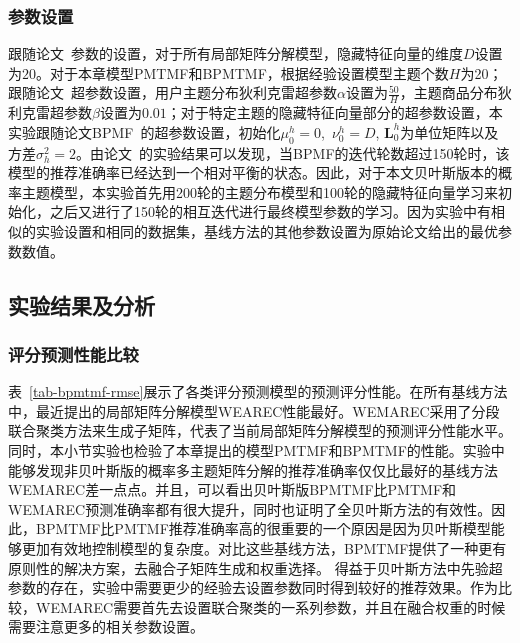 \subsubsection{参数设置} 
跟随论文~\cite{chen2015wemarec,lee2013local}参数的设置，对于所有局部矩阵分解模型，隐藏特征向量的维度$D$设置为$20$。对于本章模型PMTMF和BPMTMF，根据经验设置模型主题个数$H$为20；跟随论文~\cite{griffiths2004finding}超参数设置，用户主题分布狄利克雷超参数$\alpha$设置为$\frac{50}{H}$，主题商品分布狄利克雷超参数$\beta$设置为$0.01$；对于特定主题的隐藏特征向量部分的超参数设置，本实验跟随论文BPMF~\cite{salakhutdinov2008bayesian}的超参数设置，初始化$\mu_0^{h}=0$,\ $\nu_0^{h} = D$, $\mathbf{L}_0^{h}$为单位矩阵以及方差$\sigma_h^2=2$。由论文~\cite{salakhutdinov2008bayesian}的实验结果可以发现，当BPMF的迭代轮数超过150轮时，该模型的推荐准确率已经达到一个相对平衡的状态。因此，对于本文贝叶斯版本的概率主题模型，本实验首先用200轮的主题分布模型和100轮的隐藏特征向量学习来初始化，之后又进行了150轮的相互迭代进行最终模型参数的学习。因为实验中有相似的实验设置和相同的数据集，基线方法的其他参数设置为原始论文给出的最优参数数值。

\subsection{实验结果及分析}

\subsubsection{评分预测性能比较}
\label{subsec-bpmtmf-compare}
表~\ref{tab-bpmtmf-rmse}展示了各类评分预测模型的预测评分性能。在所有基线方法中，最近提出的局部矩阵分解模型WEAREC性能最好。WEMAREC采用了分段联合聚类方法来生成子矩阵，代表了当前局部矩阵分解模型的预测评分性能水平。同时，本小节实验也检验了本章提出的模型PMTMF和BPMTMF的性能。实验中能够发现非贝叶斯版的概率多主题矩阵分解的推荐准确率仅仅比最好的基线方法WEMAREC差一点点。并且，可以看出贝叶斯版BPMTMF比PMTMF和WEMAREC预测准确率都有很大提升，同时也证明了全贝叶斯方法的有效性。因此，BPMTMF比PMTMF推荐准确率高的很重要的一个原因是因为贝叶斯模型能够更加有效地控制模型的复杂度。对比这些基线方法，BPMTMF提供了一种更有原则性的解决方案，去融合子矩阵生成和权重选择。 得益于贝叶斯方法中先验超参数的存在，实验中需要更少的经验去设置参数同时得到较好的推荐效果。作为比较，WEMAREC需要首先去设置联合聚类的一系列参数，并且在融合权重的时候需要注意更多的相关参数设置。

